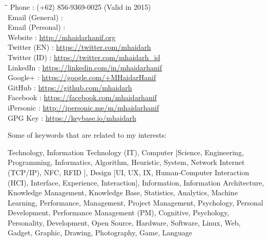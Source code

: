 \begin{tabbing}
\hspace*{3cm}\=\hspace*{0.5cm}\= \kill
Phone \>:\> (+62) 856-9369-0025 (Valid in 2015) \\
Email (General) \>:\> \myEmailGeneral \\
Email (Personal) \>:\> \myEmailPersonal \\
Website \>:\> \url{http://mhaidarhanif.org} \\
Twitter (EN) \>:\> \url{https://twitter.com/mhaidarh} \\
Twitter (ID) \>:\> \url{https://twitter.com/mhaidarh_id} \\
LinkedIn \>:\> \url{https://linkedin.com/in/mhaidarhanif} \\
Google+ \>:\> \url{https://google.com/+MHaidarHanif} \\
GitHub \>:\> \url{https://github.com/mhaidarh} \\
Facebook \>:\> \url{https://facebook.com/mhaidarhanif} \\
iPersonic \>:\> \url{http://ipersonic.me/m/mhaidarhanif} \\
GPG Key \>:\> \url{https://keybase.io/mhaidarh}
\end{tabbing}

Some of keywords that are related to my interests:

Technology, Information Technology (IT), Computer [Science, Engineering, Programming, Informatics, Algorithm, Heuristic, System, Network {Internet (TCP/IP), NFC, RFID} ], Design [UI, UX, IX, Human-Computer Interaction (HCI), Interface, Experience, Interaction], Information, Information Architecture, Knowledge Management, Knowledge Base, Statistics, Analytics, Machine Learning, Performance, Management, Project Management, Psychology, Personal Development, Performance Management (PM), Cognitive, Psychology, Personality, Development, Open Source, Hardware, Software, Linux, Web, Gadget, Graphic, Drawing, Photography, Game, Language

